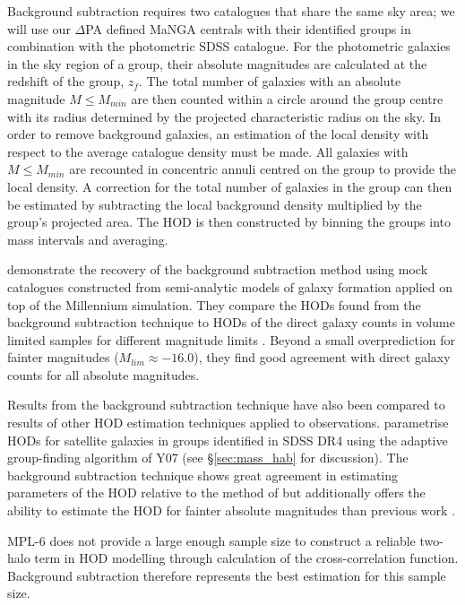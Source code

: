 Background subtraction requires two catalogues that share the same sky area; we will use our $\Delta$PA defined MaNGA centrals with their identified groups in combination with the photometric SDSS catalogue. For the photometric galaxies in the sky region of a group, their absolute magnitudes are calculated at the redshift of the group, $z_{f}$. The total number of galaxies with an absolute magnitude $M \le M_{min}$ are then counted within a circle around the group centre with its radius determined by the projected characteristic radius on the sky. In order to remove background galaxies, an estimation of the local density with respect to the average catalogue density must be made. All galaxies with $M \le M_{min}$ are recounted in concentric annuli centred on the group to provide the local density. A correction for the total number of galaxies in the group can then be estimated by subtracting the local background density multiplied by the group's projected area. The HOD is then constructed by binning the groups into mass intervals and averaging.

\citet{rodriguez2015} demonstrate the recovery of the background subtraction method using mock catalogues constructed from semi-analytic models of galaxy formation applied on top of the Millennium simulation. They compare the HODs found from the background subtraction technique to HODs of the direct galaxy counts in volume limited samples for different magnitude limits \citep[see Figure 1 in;][]{rodriguez2015}. Beyond a small overprediction for fainter magnitudes ($M_{lim} \approx -16.0$), they find good agreement with direct galaxy counts for all absolute magnitudes.

Results from the background subtraction technique have also been compared to results of other HOD estimation techniques applied to observations. \citet{yang2008} parametrise HODs for satellite galaxies in groups identified in SDSS DR4 using the adaptive group-finding algorithm of Y07 (see \S\ref{sec:mass_hab} for discussion). The background subtraction technique shows great agreement in estimating parameters of the HOD relative to the method of \citet{yang2008} but additionally offers the ability to estimate the HOD for fainter absolute magnitudes than previous work \citep[see Figure 5 in][]{rodriguez2015}.

MPL-6 does not provide a large enough sample size to construct a reliable two-halo term in HOD modelling through calculation of the cross-correlation function. Background subtraction therefore represents the best estimation for this sample size.


